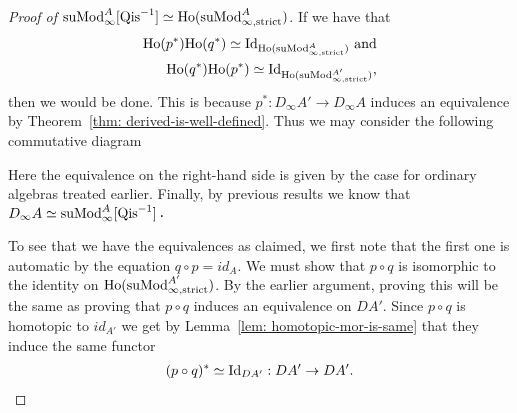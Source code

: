 \documentclass[../thesis.tex]{subfiles}
\begin{document}
\begin{proof}[Proof of $\tt{suMod}_\infty^A{[\tt{Qis}^{-1}]} \simeq \tt{Ho}(\tt{suMod}_{\infty, \tt{strict}}^A)$]
                 If we have that 
                 \begin{align*}
                    \tt{Ho}(p^*)\tt{Ho}(q^*) \simeq \tt{Id}_{\tt{Ho}(\tt{suMod}_{\infty,\tt{strict}}^A)}\tt{ and} \\
                    \tt{Ho}(q^*)\tt{Ho}(p^*) \simeq \tt{Id}_{\tt{Ho}(\tt{suMod}_{\infty,\tt{strict}}^{A'})}\tt{,}
                 \end{align*}
                 then we would be done. This is because $p^* : D_\infty A' \rightarrow D_\infty A$ induces an equivalence by Theorem~\ref{thm: derived-is-well-defined}. Thus we may consider the following commutative diagram
                 \begin{center}
                 \end{center}
                 Here the equivalence on the right-hand side is given by the case for ordinary algebras treated earlier. Finally, by previous results we know that $D_\infty A \simeq \tt{suMod}_{\infty}^A[\tt{Qis}^{-1}]$\tt{.}
                 
                 To see that we have the equivalences as claimed, we first note that the first one is automatic by the equation $q\circ p = id_A$. We must show that $p\circ q$ is isomorphic to the identity on $\tt{Ho}(\tt{suMod}_{\infty,\tt{strict}}^{A'})$. By the earlier argument, proving this will be the same as proving that $p\circ q$ induces an equivalence on $DA'$. Since $p\circ q$ is homotopic to $id_{A'}$ we get by Lemma~\ref{lem: homotopic-mor-is-same} that they induce the same functor
                 \begin{align*}
                    (p\circ q)^* \simeq \tt{Id}_{DA'} : DA' \rightarrow DA'\tt{.}
                \end{align*}
            \end{proof}
\end{document}
